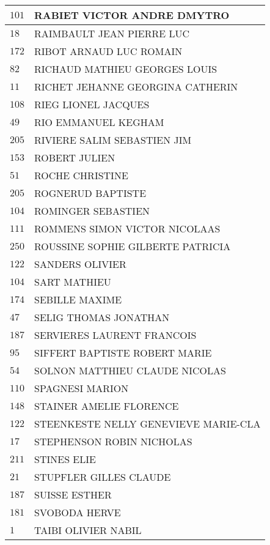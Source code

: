 \begin{xltabular}{\linewidth}{|l|X|}
    \hline
    $101$ & RABIET VICTOR ANDRE DMYTRO \\
    \hline
    $18$ & RAIMBAULT JEAN PIERRE LUC \\
    \hline
    $172$ & RIBOT ARNAUD LUC ROMAIN \\
    \hline
    $82$ & RICHAUD MATHIEU GEORGES LOUIS \\
    \hline
    $11$ & RICHET JEHANNE GEORGINA CATHERIN \\
    \hline
    $108$ & RIEG LIONEL JACQUES \\
    \hline
    $49$ & RIO EMMANUEL KEGHAM \\
    \hline
    $205$ & RIVIERE SALIM SEBASTIEN JIM \\
    \hline
    $153$ & ROBERT JULIEN \\
    \hline
    $51$ & ROCHE CHRISTINE \\
    \hline
    $205$ & ROGNERUD BAPTISTE \\
    \hline
    $104$ & ROMINGER SEBASTIEN \\
    \hline
    $111$ & ROMMENS SIMON VICTOR NICOLAAS \\
    \hline
    $250$ & ROUSSINE SOPHIE GILBERTE PATRICIA \\
    \hline
    $122$ & SANDERS OLIVIER \\
    \hline
    $104$ & SART MATHIEU \\
    \hline
    $174$ & SEBILLE MAXIME \\
    \hline
    $47$ & SELIG THOMAS JONATHAN \\
    \hline
    $187$ & SERVIERES LAURENT FRANCOIS \\
    \hline
    $95$ & SIFFERT BAPTISTE ROBERT MARIE \\
    \hline
    $54$ & SOLNON MATTHIEU CLAUDE NICOLAS \\
    \hline
    $110$ & SPAGNESI MARION \\
    \hline
    $148$ & STAINER AMELIE FLORENCE \\
    \hline
    $122$ & STEENKESTE NELLY GENEVIEVE MARIE-CLA \\
    \hline
    $17$ & STEPHENSON ROBIN NICHOLAS \\
    \hline
    $211$ & STINES ELIE \\
    \hline
    $21$ & STUPFLER GILLES CLAUDE \\
    \hline
    $187$ & SUISSE ESTHER \\
    \hline
    $181$ & SVOBODA HERVE \\
    \hline
    $1$ & TAIBI OLIVIER NABIL \\

\end{xltabular}
